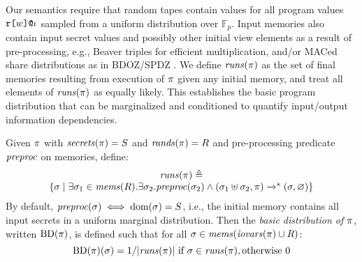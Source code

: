 Our semantics require that random tapes contain values for all program
values $\texttt{r[}w\texttt{]}\texttt{@}\iota$ sampled from a uniform distribution
over $\mathbb{F}_p$. Input memories also contain input secret values
and possibly other initial view elements as a result of
pre-processing, e.g., Beaver triples for efficient multiplication,
and/or MACed share distributions as in BDOZ/SPDZ
\cite{evans2018pragmatic,10.1007/978-3-030-68869-1_3}. We define
$\mathit{runs}(\pi)$ as the set of final memories resulting from execution
of $\pi$ given any initial memory, and treat all elements of
$\mathit{runs}(\pi)$ as equally likely.  This establishes the basic program
distribution that can be marginalized and conditioned to quantify
input/output information dependencies.
\begin{definition}
  \label{def-progtt}
  \label{def-progd}
  \label{definition-progd}
  Given $\pi$ with $\mathit{secrets}(\pi) = S$ and $\mathit{rands}(\pi) = R$ and
  pre-processing predicate $\mathit{preproc}$ on memories, define:
  $$
  \begin{array}{c}
    \mathit{runs}(\pi) \triangleq \\
    \{ \sigma \mid \exists \sigma_1 \in \mathit{mems}(R) . 
    \exists \sigma_2 . \mathit{preproc}(\sigma_2) \wedge
    (\sigma_1 \uplus \sigma_2,\pi) \xrightarrow{}^{*} (\sigma,\varnothing) \}
  \end{array}
  $$
  By default, $\mathit{preproc}(\sigma) \iff \mathrm{dom}(\sigma) = S$, i.e.,
  the initial memory contains all input secrets in a uniform
  marginal distribution. Then the \emph{basic distribution of $\pi$}, written $\mathrm{BD}(\pi)$, is
  defined such that for all $\sigma \in \mathit{mems}(\mathit{iovars}(\pi) \cup R)$:
  $$
  \mathrm{BD}(\pi)(\sigma) =  1 / |\mathit{runs}(\pi)| \ \text{if}\ \sigma \in \mathit{runs}(\pi), \text{otherwise}\ 0
  $$
  
\end{definition}


